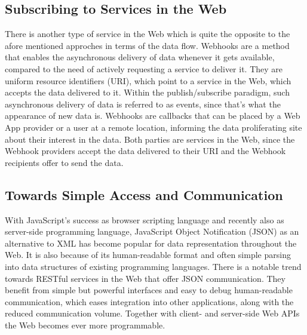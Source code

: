 \subsection{Subscribing to Services in the Web}
There is another type of service in the Web which is quite the opposite to the afore mentioned approches in terms of the data flow.
\textrm{Webhooks} are a method that enables the asynchronous delivery of data whenever it gets available, compared to the need of actively requesting a service to deliver it.
They are uniform resource identifiers (\textrm{URI}), which point to a service in the Web, which accepts the data delivered to it.
Within the publish/subscribe paradigm, such asynchronous delivery of data is referred to as events, since that's what the appearance of new data is.
\textrm{Webhooks} are callbacks that can be placed by a \textrm{Web App} provider or a user at a remote location, informing the data proliferating site about their interest in the data.
Both parties are services in the Web, since the \textrm{Webhook} providers accept the data delivered to their \textrm{URI} and the \textrm{Webhook} recipients offer to send the data.


\subsection{Towards Simple Access and Communication}
With JavaScript's success as browser scripting language and recently also as server-side programming language, JavaScript Object Notification (\textrm{JSON}) as an alternative to \textrm{XML} has become popular for data representation throughout the Web.
It is also because of its human-readable format and often simple parsing into data structures of existing programming languages.
There is a notable trend towards \textrm{RESTful} services in the Web that offer \textrm{JSON} communication.
They benefit from simple but powerful interfaces and easy to debug human-readable communication, which eases integration into other applications, along with the reduced communication volume.
Together with client- and server-side \textrm{Web APIs} the Web becomes ever more programmable.



